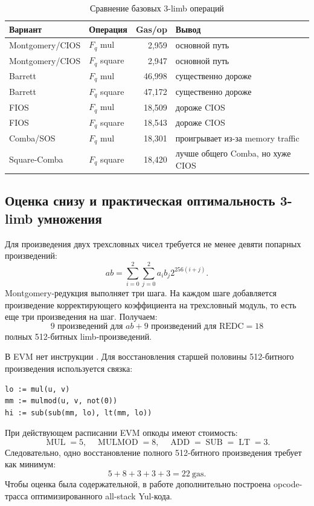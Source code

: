 \documentclass[12pt,a4paper]{article}
\newcommand{\Gas}{\mathrm{gas}}
\newcommand{\code}[1]{\texttt{\detokenize{#1}}}
\begin{document}
\begin{table}[htbp]
\centering
\caption{Сравнение базовых 3-limb операций}
\small
\begin{tabularx}{\linewidth}{Y l r Y}
\toprule
Вариант & Операция & Gas/op & Вывод \\
\midrule
Montgomery/CIOS & $F_q$ mul & 2,959 & основной путь \\
Montgomery/CIOS & $F_q$ square & 2,947 & основной путь \\
Barrett & $F_q$ mul & 46,998 & существенно дороже \\
Barrett & $F_q$ square & 47,172 & существенно дороже \\
FIOS & $F_q$ mul & 18,509 & дороже CIOS \\
FIOS & $F_q$ square & 18,543 & дороже CIOS \\
Comba/SOS & $F_q$ mul & 18,301 & проигрывает из-за memory traffic \\
Square-Comba & $F_q$ square & 18,420 & лучше общего Comba, но хуже CIOS \\
\bottomrule
\end{tabularx}
\end{table}

\subsection{Оценка снизу и практическая оптимальность 3-limb умножения}

Для произведения двух трехсловных чисел требуется не менее девяти попарных
произведений:
\[
    ab=\sum_{i=0}^{2}\sum_{j=0}^{2}a_i b_j 2^{256(i+j)}.
\]
Montgomery-редукция выполняет три шага. На каждом шаге добавляется произведение
корректирующего коэффициента на трехсловный модуль, то есть еще три произведения
на шаг. Получаем:
\[
    9\text{ произведений для }ab+
    9\text{ произведений для REDC}=18
\]
полных 512-битных limb-произведений.

В EVM нет инструкции \code{MULHI}. Для восстановления старшей половины
512-битного произведения используется связка:
\begin{verbatim}
lo := mul(u, v)
mm := mulmod(u, v, not(0))
hi := sub(sub(mm, lo), lt(mm, lo))
\end{verbatim}

При действующем расписании EVM опкоды имеют стоимость:
\[
    \operatorname{MUL}=5,\quad
    \operatorname{MULMOD}=8,\quad
    \operatorname{ADD}=\operatorname{SUB}=\operatorname{LT}=3.
\]
Следовательно, одно восстановление полного 512-битного произведения требует
как минимум:
\[
    5+8+3+3+3=22\ \Gas.
\]
Чтобы оценка была содержательной, в работе дополнительно построена  opcode-трасса оптимизированного all-stack Yul-кода.
\end{document}
